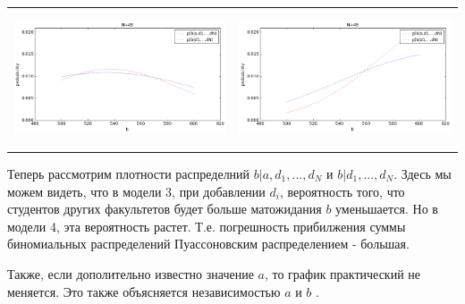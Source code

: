 \documentclass[12pt, a4paper]{article}
\begin{document}
\begin{center}
\begin{tabular}{ c  c }
  				\includegraphics[width=8cm, height=4cm]{graphs/m3_gen_n49.png} &
  				\includegraphics[width=8cm, height=4cm]{graphs/m4_gen_n49.png} \\
			\end{tabular}
			\end{center}
			
			Теперь рассмотрим плотности распределний $b|a,d_1,...,d_N$ и $b|d_1,...,d_N$. Здесь мы можем видеть, что в модели 3, при добавлении $d_i$, вероятность того, что студентов других факультетов будет больше матожидания $b$ уменьшается. Но в модели 4, эта вероятность растет. Т.е. погрешность прибилжения суммы биномиальных распределений Пуассоновским распределением - большая.
			
			Также, если дополительно известно значение $a$, то график практический не меняется. Это также объясняется независимостью $a$ и $b$ .
			
\end{document}
